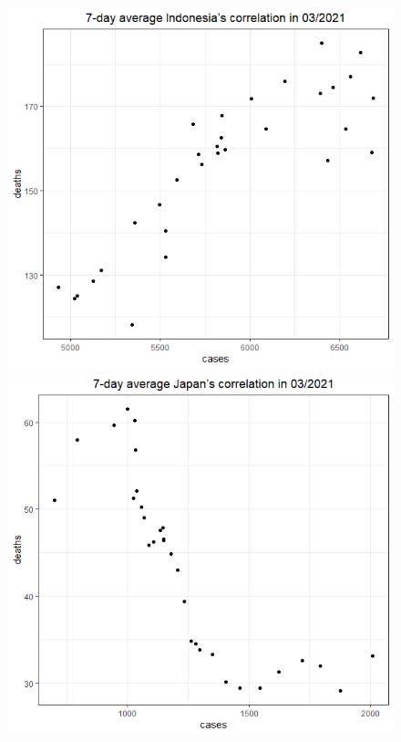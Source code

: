 \documentclass[a4paper]{article}
\theoremstyle{definition}
\begin{document}
\begin{enumerate}[1)]
\begin{figure}[H]
\begin{center}
        \includegraphics[scale = 0.3]{ix/ix.3/IDN_03_2021.png}
        \includegraphics[scale = 0.3]{ix/ix.3/JPN_03_2021.png}
        

\end{center}
\end{figure}
\end{enumerate}
\end{document}
